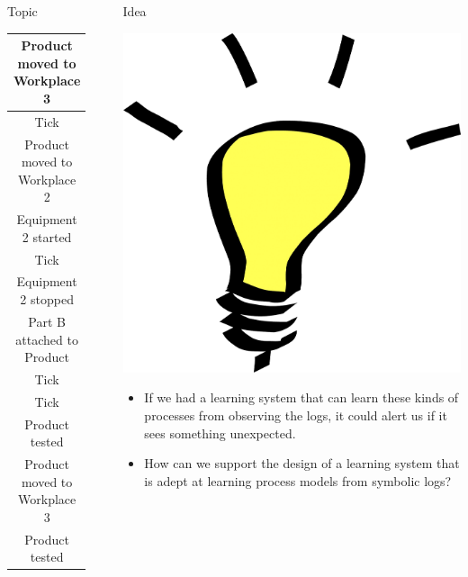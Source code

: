 \documentclass[final,xcolor={usenames,x11names}]{beamer}
\newlength{\sepwid}
\newlength{\halfcolwid}
\newlength{\onecolwid}
\begin{document}
\begin{frame}[t]
\begin{columns}[t]
\begin{column}{\halfcolwid}
\begin{alertblock}{Topic}
\begin{center}
{\begin{tabular}{|c|}
  \hline
  \cellcolor{PaleTurquoise1}
Product moved to Workplace 3
  \\
  \hline
  \cellcolor{PaleTurquoise1>wheel,4,5}
Tick
  \\
  \hline
  \cellcolor{PaleTurquoise1>wheel,1,5}
Product moved to Workplace 2
  \\
  \hline
  \cellcolor{PaleTurquoise1>wheel,2,5}
Equipment 2 started
  \\
  \hline
  \cellcolor{PaleTurquoise1>wheel,4,5}
Tick
  \\
  \hline
  \cellcolor{PaleTurquoise1>wheel,2,5}
Equipment 2 stopped
  \\
  \hline
  \cellcolor{PaleTurquoise1>wheel,1,5}
Part B attached to Product
  \\
  \hline
  \cellcolor{PaleTurquoise1>wheel,4,5}
Tick
  \\
  \hline
  \cellcolor{PaleTurquoise1>wheel,4,5}
Tick
  \\
  \hline
  \cellcolor{PaleTurquoise1}
Product tested
  \\
  \hline
  \cellcolor{PaleTurquoise1>wheel,1,5}
Product moved to Workplace 3
  \\
  \hline
  \cellcolor{PaleTurquoise1>wheel,1,5}
Product tested
  \\
  \hline
\end{tabular}
}
\end{center}

\end{alertblock}
\end{column}

\begin{column}{\sepwid}\end{column} %

\begin{column}{\onecolwid}
\begin{block}{Idea}

{\centering
\includegraphics[width=4 cm,keepaspectratio=true]{./bulb.png}\par
}

\begin{itemize}
\item If we had a learning system that can learn these kinds of processes from observing the logs, it could alert us if it sees something unexpected.
\item How can we support the design of a learning system that is adept at learning process models from symbolic logs?
\end{itemize}


\end{block}
\end{column}
\end{columns}
\end{frame}
\end{document}
